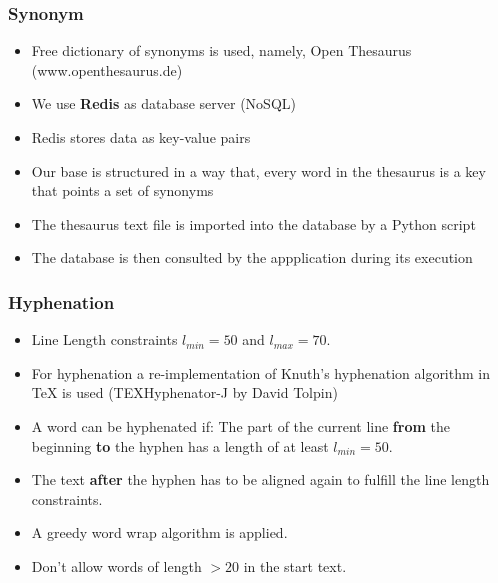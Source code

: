 \documentclass{beamer}
\begin{document}
\begin{frame}
\frametitle{Synonym}
\begin{itemize}
	\item Free dictionary of synonyms is used, namely, Open Thesaurus (www.openthesaurus.de)
	\item We use \textbf{Redis} as database server (NoSQL)
	\item Redis stores data as key-value pairs
	\item Our base is structured in a way that, every word in the thesaurus is a key that points a set of synonyms
	\item The thesaurus text file is imported into the database by a Python script
	\item The database is then consulted by the appplication during its execution
\end{itemize}
\end{frame}

\begin{frame}
\frametitle{Hyphenation}


\begin{itemize}
\item Line Length constraints $l_{min}=50$ and $l_{max}=70.$



\item For hyphenation a re-implementation of Knuth's hyphenation algorithm in
TeX is used (TEXHyphenator-J by David Tolpin) 

\item A word can be hyphenated if: The part of the current line \textbf{from} the beginning \textbf{to} the hyphen has a length of at least $l_{min}=50.$

\item The text \textbf{after} the hyphen has to be aligned again to fulfill the line length
constraints.



\item A greedy word wrap algorithm is applied. 

\item Don't allow words of length $>20$ in the start text.
\end{itemize}

\end{frame}
\end{document}
